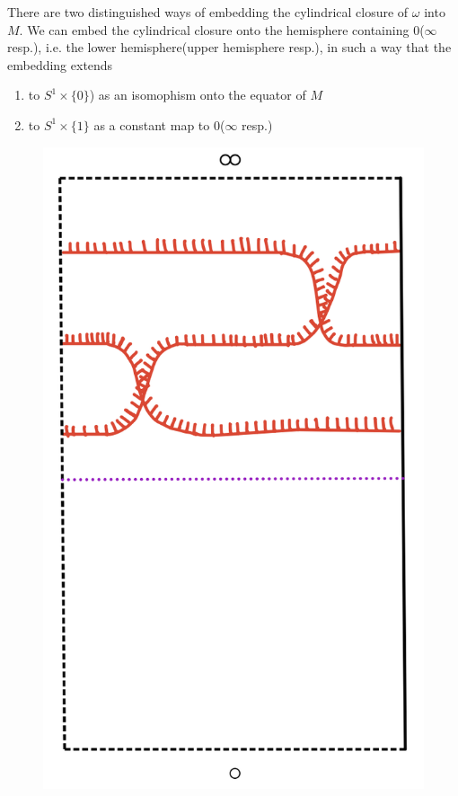 There are two distinguished ways of embedding the cylindrical closure of $\omega$ into $M$. We can embed the cylindrical closure onto the hemisphere containing $0$($\infty$ resp.), i.e. the lower hemisphere(upper hemisphere resp.), in such a way that the embedding extends

\begin{enumerate}[label = (\roman*)]
\item to $S^1 \times \{ 0 \}$) as an isomophism onto the equator of $M$
\item to  $S^1 \times \{ 1 \}$ as a constant map to $0$($\infty$ resp.)
\end{enumerate}

\begin{figure}[H]
    \centering
    \includegraphics[scale = 0.95]{diagrams/natural_alternating_diagrams/4-1.png} 
    \caption{}
    \label{fig:your-label}
\end{figure}

